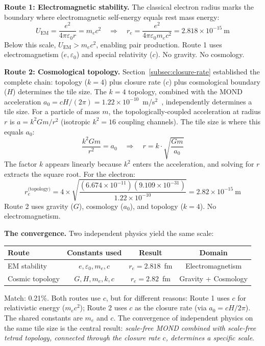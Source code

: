 \documentclass[aps,prd,preprint,superscriptaddress,showpacs,preprintnumbers,amsmath,amssymb,nofootinbib]{revtex4-2}
\begin{document}
\textbf{Route 1: Electromagnetic stability.} The classical electron radius marks the boundary where electromagnetic self-energy equals rest mass energy:
\begin{equation}
U_{\text{EM}} = \frac{e^2}{4\pi\varepsilon_0 r} = m_e c^2 \quad \Rightarrow \quad r_e = \frac{e^2}{4\pi\varepsilon_0 m_e c^2} = 2.818 \times 10^{-15}~\text{m}
\label{eq:re-em}
\end{equation}
Below this scale, $U_{\text{EM}} > m_e c^2$, enabling pair production. Route 1 uses electromagnetism ($e, \varepsilon_0$) and special relativity ($c$). No gravity. No cosmology.

\textbf{Route 2: Cosmological topology.} Section~\ref{subsec:closure-rate} established the complete chain: topology ($k=4$) plus closure rate ($c$) plus cosmological boundary ($H$) determines the tile size. The $k=4$ topology, combined with the MOND acceleration $a_0 = cH/(2\pi) = 1.22 \times 10^{-10}$~m/s$^2$~\cite{milgrom1983}, independently determines a tile size. For a particle of mass $m$, the topologically-coupled acceleration at radius $r$ is $a = k^2 Gm/r^2$ (isotropic $k^2 = 16$ coupling channels). The tile size is where this equals $a_0$:
\begin{equation}
\frac{k^2 Gm}{r^2} = a_0 \quad \Rightarrow \quad r = k \cdot \sqrt{\frac{Gm}{a_0}}
\label{eq:tile-topology}
\end{equation}
The factor $k$ appears linearly because $k^2$ enters the acceleration, and solving for $r$ extracts the square root. For the electron:
\begin{equation}
r_e^{\text{(topology)}} = 4 \times \sqrt{\frac{(6.674 \times 10^{-11})(9.109 \times 10^{-31})}{1.22 \times 10^{-10}}} = 2.82 \times 10^{-15}~\text{m}
\label{eq:re-topo}
\end{equation}
Route 2 uses gravity ($G$), cosmology ($a_0$), and topology ($k=4$). No electromagnetism.

\textbf{The convergence.} Two independent physics yield the same scale:

\begin{table}[H]
\centering
\begin{tabular*}{\textwidth}{@{\extracolsep{\fill}} lccc @{}}
\toprule
\textbf{Route} & \textbf{Constants used} & \textbf{Result} & \textbf{Domain} \\
\midrule
EM stability & $e, \varepsilon_0, m_e, c$ & $r_e = 2.818$~fm & Electromagnetism \\
Cosmic topology & $G, H, m_e, k, c$ & $r_e = 2.82$~fm & Gravity + Cosmology \\
\bottomrule
\end{tabular*}
\end{table}
Match: 0.21\%. Both routes use $c$, but for different reasons: Route 1 uses $c$ for relativistic energy ($m_e c^2$); Route 2 uses $c$ as the closure rate (via $a_0 = cH/2\pi$). The shared constants are $m_e$ and $c$. The convergence of independent physics on the same tile size is the central result: \emph{scale-free MOND combined with scale-free tetrad topology, connected through the closure rate $c$, determines a specific scale}.
\end{document}
